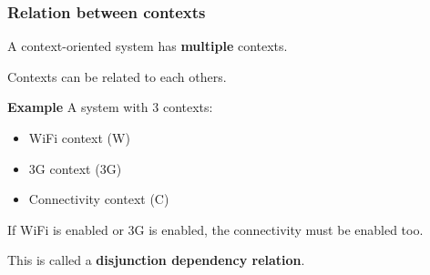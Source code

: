 \documentclass{beamer}
\begin{document}
\begin{frame}
	\frametitle{Relation between contexts}

	A context-oriented system has \textbf{multiple} contexts.
	\bigskip

	Contexts can be related to each others.
	\bigskip

	\textbf{Example} A system with 3 contexts:

	\begin{itemize}
		\item WiFi context (W)
		\item 3G context (3G)
		\item Connectivity context (C)
	\end{itemize}
	\pause

	If WiFi is enabled or 3G is enabled, the connectivity must be enabled
	too.

	\pause
	\bigskip
	This is called a \textbf{disjunction dependency relation}.

\end{frame}






































\end{document}
